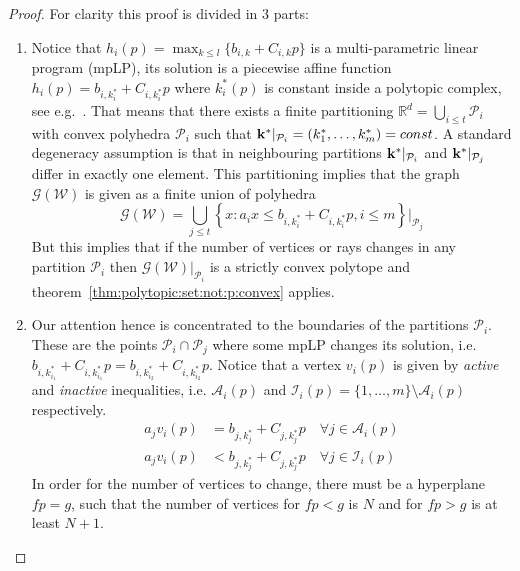 \begin{proof}
For clarity this proof is divided in 3 parts:
\begin{enumerate}
\item Notice that $h_i(p) = \max_{k\leq l} \{b_{i,k} + C_{i,k}p\}$ is a multi-parametric linear program (mpLP),
its solution is a piecewise affine function $h_i(p) = b_{i,k^\ast_i} + C_{i,k^\ast_i}p$ where $k^\ast_i(p)$ is constant
inside a polytopic complex, see e.g.~\cite{spjotvold:2005}.
%
That means that there exists a finite partitioning $\mathbb R^d = \bigcup_{i\leq t} \mathcal P_i$ with convex polyhedra 
$\mathcal P_i$ such that ${\bf{k}}^\ast\vert_{\mathcal P_i} = (k_1^\ast,\dots,k_m^\ast) = const$.
%
A standard degeneracy assumption is that in neighbouring partitions ${\bf{k}}^\ast\vert_{\mathcal P_i}$ and 
${\bf{k}}^\ast\vert_{\mathcal P_j}$ differ in exactly one element.
%
This partitioning implies that the graph $\mathscr G(\mathcal W)$ is given as a finite union of polyhedra
%
\begin{equation*}
	\mathscr G(\mathcal W) = \bigcup_{j\leq t} \left\{x: a_i x \leq b_{i,k_i^\ast} + C_{i,k_i^\ast}p,i\leq m
	\right\}\bigr\vert_{\mathcal P_j}
\end{equation*}
%
But this implies that if the number of vertices or rays changes in any partition $\mathcal P_i$ then $\mathscr
G(\mathcal W)\vert_{\mathcal P_i}$ is a strictly convex polytope and theorem~\ref{thm:polytopic:set:not:p:convex} applies.
%
\item Our attention hence is concentrated to the boundaries of the partitions $\mathcal P_i$.
%
These are the points $\mathcal P_i \cap \mathcal P_j$ where some mpLP changes its solution, i.e. 
$b_{i,k_{i_1}^\ast} + C_{i,k_{i_1}^\ast} p = b_{i,k_{i_2}^\ast} + C_{i,k_{i_2}^\ast} p$.
%
Notice that a vertex $v_i(p)$ is given by \emph{active} and \emph{inactive} inequalities, i.e. $\mathcal A_i(p)$ and
$\mathcal I_i(p) = \{1,\dots,m\}\setminus\mathcal A_i(p)$ respectively.
%
\begin{equation*}\begin{split}
	a_j v_i(p) &= b_{j,k_j^\ast} + C_{j,k_j^\ast} p \quad\forall j\in\mathcal A_i(p)\\
	a_j v_i(p) &< b_{j,k_j^\ast} + C_{j,k_j^\ast} p \quad\forall j\in\mathcal I_i(p)
\end{split}\end{equation*}
%
In order for the number of vertices to change, there must be a hyperplane $fp=g$, such that the number of vertices for $fp<g$ is 
$N$ and for $fp>g$ is at least $N+1$.

\end{enumerate}
\end{proof}
